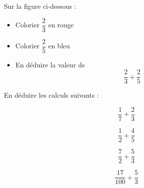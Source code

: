 \begin{minipage}[t]{0.3\textwidth}
    Sur la figure ci-dessous :
    \begin{itemize}
        \item Colorier $\dfrac{2}{3}$ en rouge
        \item Colorier $\dfrac{2}{5}$ en bleu
        \item En déduire la valeur de $$\dfrac{2}{3}+\dfrac{2}{5}$$
    \end{itemize}
    \begin{figure}[H]
        \center
    \end{figure}
\end{minipage}

En déduire les calculs suivants :

\begin{multicols}{4}
    $$\dfrac{1}{7}+\dfrac{2}{3}$$

    $$\dfrac{1}{2}+\dfrac{4}{5}$$

    $$\dfrac{7}{2}+\dfrac{5}{3}$$

    $$\dfrac{17}{100}+\dfrac{5}{3}$$
\end{multicols}